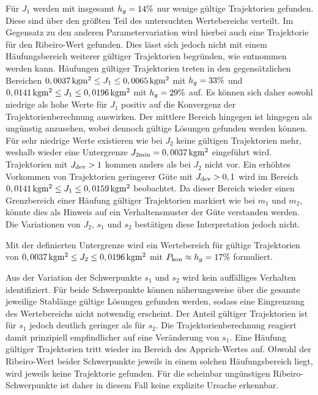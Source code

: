 Für $J_1$ werden mit insgesamt $h_g=14\%$ nur wenige gültige Trajektorien gefunden. Diese sind über den größten Teil des untersuchten Wertebereichs verteilt. Im Gegensatz zu den anderen Parametervariation wird hierbei auch eine Trajektorie für den Ribeiro-Wert gefunden. Dies lässt sich jedoch nicht mit einem Häufungsbereich weiterer gültiger Trajektorien begründen, wie  entnommen werden kann. Häufungen gültiger Trajektorien treten in den gegensätzlichen Bereichen $0,0037\,\mathrm{kg m^2}\leq J_1 \leq 0,0065\,\mathrm{kg m^2}$ mit $h_g=33 \%$ und $0,0141\,\mathrm{kg m^2}\leq J_1 \leq 0,0196\,\mathrm{kg m^2}$ mit $h_g=29 \%$ auf. Es können sich daher sowohl niedrige als hohe Werte für $J_1$ positiv auf die Konvergenz der Trajektorienberechnung auswirken. Der mittlere Bereich hingegen ist hingegen als ungünstig anzusehen, wobei dennoch gültige Lösungen gefunden werden können. Für sehr niedrige Werte existieren wie bei $J_2$ keine gültigen Trajektorien mehr, weshalb wieder eine Untergrenze $J_{2\mathrm{min}} = 0,0037\,\mathrm{kg m^2}$ eingeführt wird.
Trajektorien mit $J_{\mathrm{dev}}>1$ kommen anders als bei $J_2$ nicht vor. Ein erhöhtes Vorkommen von Trajektorien geringerer Güte mit $J_{\mathrm{dev}}>0,1$ wird im Bereich $0,0141\,\mathrm{kg m^2}\leq J_1 \leq 0,0159\,\mathrm{kg m^2}$ beobachtet. Da dieser Bereich wieder einen Grenzbereich einer Häufung gültiger Trajektorien markiert wie bei $m_1$ und $m_2$, könnte dies als Hinweis auf ein Verhaltensmuster der Güte verstanden werden. Die Variationen von $J_2$, $s_1$ und $s_2$ bestätigen diese Interpretation jedoch nicht.  

Mit der definierten Untergrenze wird ein Wertebereich für gültige Trajektorien von $0,0037\,\mathrm{kg m^2}\leq J_2 \leq 0,0196\,\mathrm{kg m^2}$ mit $P_{\mathrm{kon}}\approx h_g=17 \%$ formuliert.

Aus der Variation der Schwerpunkte $s_1$ und $s_2$ wird kein auffälliges Verhalten identifiziert. Für beide Schwerpunkte können näherungsweise über die gesamte jeweilige Stablänge gültige Lösungen gefunden werden, sodass eine Eingrenzung des Wertebereichs nicht notwendig erscheint. Der Anteil gültiger Trajektorien ist für $s_1$ jedoch deutlich geringer als für $s_2$. Die Trajektorienberechnung reagiert damit prinzipiell empfindlicher auf eine Veränderung von $s_1$. Eine Häufung gültiger Trajektorien tritt wieder im Bereich des Apprich-Wertes auf. Obwohl der Ribeiro-Wert beider Schwerpunkte jeweils in einem solchen Häufungsbereich liegt, wird jeweils keine Trajektorie gefunden. Für die scheinbar ungünstigen Ribeiro-Schwerpunkte ist daher in diesem Fall keine explizite Ursache erkennbar.

